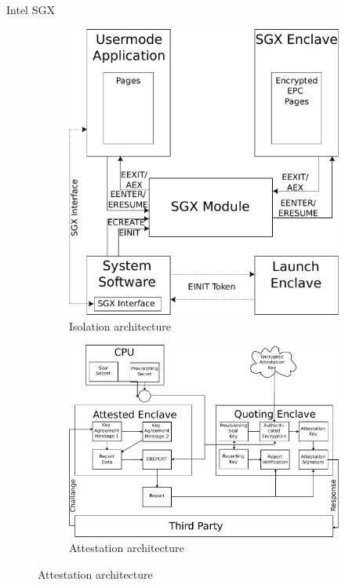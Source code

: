 \documentclass[aspectratio=169]{beamer}
\begin{document}
\begin{frame}{Intel SGX}
    \begin{figure}
        \begin{subfigure}[]{0.40\textwidth}
            \includegraphics[width=\textwidth]{images/sgx_components.pdf}
            \caption{Isolation architecture}
        \end{subfigure}
        \begin{subfigure}[]{0.45\textwidth}
            \includegraphics[width=\textwidth]{images/sgx_remote_attestation.pdf}
            \caption{Attestation architecture}
        \end{subfigure}
    \end{figure}
\end{frame}
\end{document}
